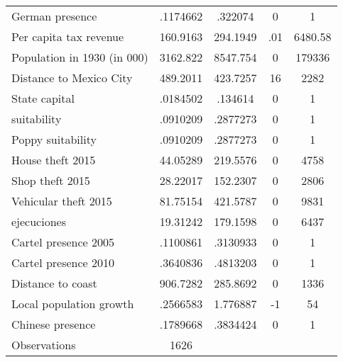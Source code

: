 {\begin{tabular}{l*{1}{cccc}}
German presence     &    .1174662&     .322074&           0&           1\\
Per capita tax revenue&    160.9163&    294.1949&         .01&     6480.58\\
Population in 1930 (in 000)&    3162.822&    8547.754&           0&      179336\\
Distance to Mexico City&    489.2011&    423.7257&          16&        2282\\
State capital       &    .0184502&     .134614&           0&           1\\
suitability         &    .0910209&    .2877273&           0&           1\\
Poppy suitability   &    .0910209&    .2877273&           0&           1\\
House theft 2015    &    44.05289&    219.5576&           0&        4758\\
Shop theft 2015     &    28.22017&    152.2307&           0&        2806\\
Vehicular theft 2015&    81.75154&    421.5787&           0&        9831\\
ejecuciones         &    19.31242&    179.1598&           0&        6437\\
Cartel presence 2005&    .1100861&    .3130933&           0&           1\\
Cartel presence 2010&    .3640836&    .4813203&           0&           1\\
Distance to coast   &    906.7282&    285.8692&           0&        1336\\
Local population growth&    .2566583&    1.776887&          -1&          54\\
Chinese presence    &    .1789668&    .3834424&           0&           1\\
\hline
Observations        &        1626&            &            &            \\
\hline\hline
\end{tabular}
}
